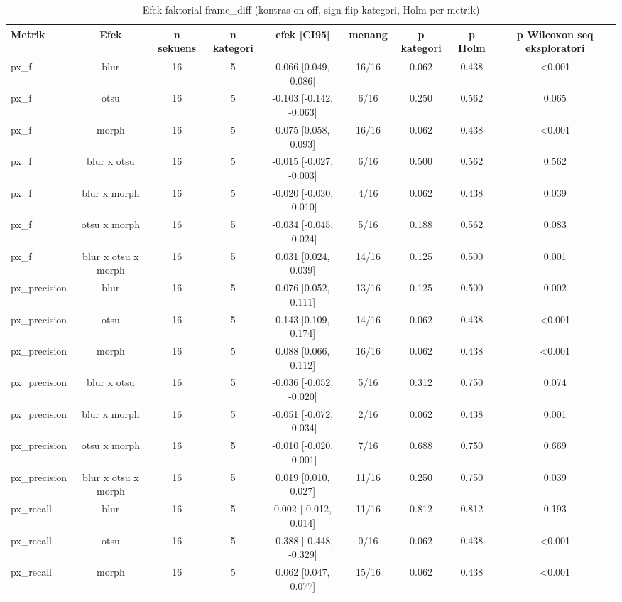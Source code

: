 \begin{table}[t]
\centering
\caption{Efek faktorial frame\_diff (kontras on-off, sign-flip kategori, Holm per metrik)}
\label{tab:stats_ablation_frame_diff}
\begin{tabular}{lcccccccc}
\toprule
Metrik & Efek & n sekuens & n kategori & efek [CI95] & menang & p kategori & p Holm & p Wilcoxon seq eksploratori \\
\midrule
px\_f & blur & 16 & 5 & 0.066 [0.049, 0.086] & 16/16 & 0.062 & 0.438 & <0.001 \\
px\_f & otsu & 16 & 5 & -0.103 [-0.142, -0.063] & 6/16 & 0.250 & 0.562 & 0.065 \\
px\_f & morph & 16 & 5 & 0.075 [0.058, 0.093] & 16/16 & 0.062 & 0.438 & <0.001 \\
px\_f & blur x otsu & 16 & 5 & -0.015 [-0.027, -0.003] & 6/16 & 0.500 & 0.562 & 0.562 \\
px\_f & blur x morph & 16 & 5 & -0.020 [-0.030, -0.010] & 4/16 & 0.062 & 0.438 & 0.039 \\
px\_f & otsu x morph & 16 & 5 & -0.034 [-0.045, -0.024] & 5/16 & 0.188 & 0.562 & 0.083 \\
px\_f & blur x otsu x morph & 16 & 5 & 0.031 [0.024, 0.039] & 14/16 & 0.125 & 0.500 & 0.001 \\
px\_precision & blur & 16 & 5 & 0.076 [0.052, 0.111] & 13/16 & 0.125 & 0.500 & 0.002 \\
px\_precision & otsu & 16 & 5 & 0.143 [0.109, 0.174] & 14/16 & 0.062 & 0.438 & <0.001 \\
px\_precision & morph & 16 & 5 & 0.088 [0.066, 0.112] & 16/16 & 0.062 & 0.438 & <0.001 \\
px\_precision & blur x otsu & 16 & 5 & -0.036 [-0.052, -0.020] & 5/16 & 0.312 & 0.750 & 0.074 \\
px\_precision & blur x morph & 16 & 5 & -0.051 [-0.072, -0.034] & 2/16 & 0.062 & 0.438 & 0.001 \\
px\_precision & otsu x morph & 16 & 5 & -0.010 [-0.020, -0.001] & 7/16 & 0.688 & 0.750 & 0.669 \\
px\_precision & blur x otsu x morph & 16 & 5 & 0.019 [0.010, 0.027] & 11/16 & 0.250 & 0.750 & 0.039 \\
px\_recall & blur & 16 & 5 & 0.002 [-0.012, 0.014] & 11/16 & 0.812 & 0.812 & 0.193 \\
px\_recall & otsu & 16 & 5 & -0.388 [-0.448, -0.329] & 0/16 & 0.062 & 0.438 & <0.001 \\
px\_recall & morph & 16 & 5 & 0.062 [0.047, 0.077] & 15/16 & 0.062 & 0.438 & <0.001 \\

\end{tabular}
\end{table}
